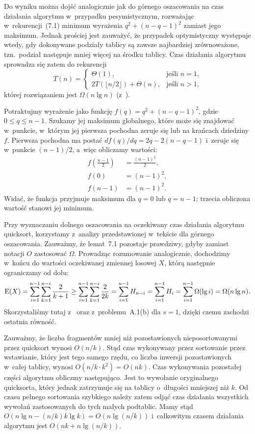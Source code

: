Do wyniku można dojść analogicznie jak do górnego oszacowania na czas działania algorytmu w~przypadku pesymistycznym, rozważając w~rekurencji~(7.1) minimum wyrażenia $q^2+(n-q-1)^2$ zamiast jego maksimum. Jednak prościej jest zauważyć, że przypadek optymistyczny występuje wtedy, gdy dokonywane podziały tablicy są zawsze najbardziej zrównoważone, tzn.\ podział następuje mniej więcej na środku tablicy. Czas działania algorytmu sprowadza się zatem do rekurencji
\[
	T(n) = \begin{cases}
		\Theta(1), & \text{jeśli $n=1$,} \\
		2T(\lfloor n/2\rfloor)+\Theta(n), & \text{jeśli $n>1$,}
	\end{cases}
\]
której rozwiązaniem jest $\Omega(n\lg n)$ (z~).

\exercise %
Potraktujmy wyrażenie jako funkcję $f(q)=q^2+(n-q-1)^2$, gdzie $0\le q\le n-1$. Szukamy jej maksimum globalnego, które może się znajdować w~punkcie, w~którym jej pierwsza pochodna zeruje się lub na krańcach dziedziny $f$. Pierwsza pochodna ma postać $df(q)/dq=2q-2(n-q-1)$ i~zeruje się w~punkcie $(n-1)/2$, a~więc obliczamy wartości:
\begin{align*}
	f\left(\frac{n-1}{2}\right) &= \frac{(n-1)^2}{2}, \\
	f(0) &= (n-1)^2, \\
	f(n-1) &= (n-1)^2.
\end{align*}
Widać, że funkcja przyjmuje maksimum dla $q=0$ lub $q=n-1$; trzecia obliczona wartość stanowi jej minimum.

\exercise %
Przy wyznaczaniu dolnego oszacowania na oczekiwany czas działania algorytmu quicksort, korzystamy z~analizy przedstawionej w~tekście dla górnego oszacowania. Zauważmy, że lemat~7.1 pozostaje prawdziwy, gdyby zamiast notacji $O$ zastosować $\Omega$. Prowadząc rozumowanie analogicznie, dochodzimy w~końcu do wartości oczekiwanej zmiennej losowej $X$, którą następnie ograniczamy od dołu:
\[
	\operatorname{E}(X) = \sum_{i=1}^{n-1}\sum_{k=1}^{n-i}\frac{2}{k+1} \ge \sum_{i=1}^{n-1}\sum_{k=1}^{n-i}\frac{2}{2k} = \sum_{i=1}^{n-1}H_{n-i} = \sum_{i=1}^{n-1}H_i = \sum_{i=1}^{n-1}\Omega(\lg i) = \Omega(n\lg n).
\]
Skorzystaliśmy tutaj z~ oraz z~problemu~A.1(b) dla $s=1$, dzięki czemu zachodzi ostatnia równość.

\exercise %
Zauważmy, że liczba fragmentów mniej niż  pozostawionych nieposortowanymi przez quicksort wynosi $O(n/k)$. Stąd czas wykonywany przez sortowanie przez wstawianie, który jest tego samego rzędu, co liczba inwersji pozostawionych w~całej tablicy, wynosi $O(n/k\cdot k^2)=O(nk)$. Czas wykonywania pozostałej części algorytmu obliczmy następująco. Jest to wywołanie oryginalnego quicksorta, który jednak zatrzymuje się na tablicy o~długości mniejszej niż $k$. Od czasu pełnego sortowania szybkiego należy zatem odjąć czas działania wszystkich wywołań zastosowanych do tych małych podtablic. Mamy stąd $O(n\lg n-(n/k)k\lg k)=O(n\lg(n/k))$ i~całkowitym czasem działania algorytmu jest $O(nk+n\lg(n/k))$.

